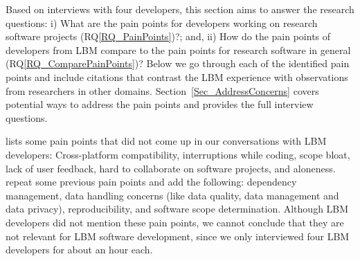 \documentclass[final, 3p, times, authoryear]{elsarticle}
\newcommand{\rqref}[1]{RQ\ref{#1}}
\begin{document}
Based on interviews with four developers, this section aims to answer the
research questions: i) What are the pain points for developers working on
research software projects (\rqref{RQ_PainPoints})?; and, ii) How do the pain
points of developers from LBM compare to the pain points for research software
in general (\rqref{RQ_ComparePainPoints})?  Below we go through each of the
identified pain points and include citations that contrast the LBM experience
with observations from researchers in other domains.
Section~\ref{Sec_AddressConcerns} covers potential ways to address the pain
points and \citet{SmithEtAl2021} provides the full interview questions.

\citet{PintoEtAl2018} lists some pain points that did not come up in our
conversations with LBM developers: Cross-platform compatibility, interruptions
while coding, scope bloat, lack of user feedback, hard to collaborate on
software projects, and aloneness. \citet{WieseEtAl2019} repeat some previous
pain points and add the following: dependency management, data handling concerns
(like data quality, data management and data privacy), reproducibility, and
software scope determination. Although LBM developers did not mention these pain
points, we cannot conclude that they are not relevant for LBM software
development, since we only interviewed four LBM developers for about an hour
each.
\end{document}
